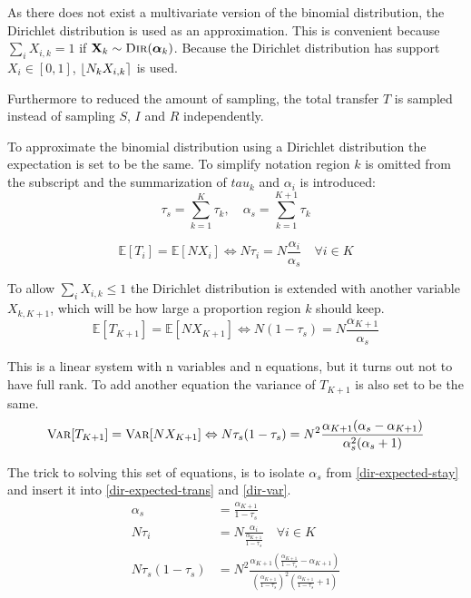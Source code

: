 As there does not exist a multivariate version of the binomial distribution, the Dirichlet distribution is used as an approximation. This is convenient because $\sum_{i} X_{i,k} = 1$ if $\mathbf{X}_k \sim \textsc{Dir}(\boldsymbol{\alpha}_k)$. Because the Dirichlet distribution has support $X_i \in [0, 1]$, $\iround*{N_k X_{i,k}}$ is used.

Furthermore to reduced the amount of sampling, the total transfer $T$ is sampled instead of sampling $S$, $I$ and $R$ independently.

To approximate the binomial distribution using a Dirichlet distribution the expectation is set to be the same. To simplify notation region $k$ is omitted from the subscript and the summarization of $tau_k$ and $\alpha_i$ is introduced:
\begin{equation}
\tau_s = \sum_{k = 1}^{K} \tau_k, \quad \alpha_s = \sum_{k = 1}^{K+1} \tau_k
\end{equation}

\begin{equation}
\mathbb{E}[T_{i}] = \mathbb{E}[N X_i] \Leftrightarrow N \tau_i = N \frac{\alpha_i}{\alpha_s} \quad \forall i \in K
\label{dir-expected-trans}
\end{equation}

To allow $\sum_{i} X_{i,k} \le 1$ the Dirichlet distribution is extended with another variable $X_{k, K+1}$, which will be how large a proportion region $k$ should keep.
\begin{equation}
\mathbb{E}[T_{K+1}] = \mathbb{E}[N X_{K+1}] \Leftrightarrow N \left(1 - \tau_s\right) = N \frac{\alpha_{K+1}}{\alpha_s}
\label{dir-expected-stay}
\end{equation}
  
This is a linear system with n variables and n equations, but it turns out not to have full rank. To add another equation the variance of $T_{K+1}$ is also set to be the same.
\begin{equation}
\textsc{Var}[T_{K+1}] = \textsc{Var}[N X_{K+1}] \Leftrightarrow N\tau_s (1 - \tau_s) = N^2 \frac{\alpha_{K+1}(\alpha_s - \alpha_{K+1})}{\alpha_s^2 (\alpha_s + 1)}
\label{dir-var}
\end{equation}

The trick to solving this set of equations, is to isolate $\alpha_s$ from \eqref{dir-expected-stay} and insert it into \eqref{dir-expected-trans} and \eqref{dir-var}.
\begin{align}
\alpha_s &= \frac{\alpha_{K+1}}{1 - \tau_s} \label{dir-expected-intermediate} \\
N \tau_i &= N \frac{\alpha_i}{\frac{\alpha_{K+1}}{1 - \tau_s}} \quad \forall i \in K \\
N\tau_s (1 - \tau_s) &= N^2 \frac{\alpha_{K+1}\left(\frac{\alpha_{K+1}}{1 - \tau_s} - \alpha_{K+1}\right)}{\left(\frac{\alpha_{K+1}}{1 - \tau_s}\right)^2 \left(\frac{\alpha_{K+1}}{1 - \tau_s} + 1\right)} \label{dir-var-intermediate}
\end{align}

